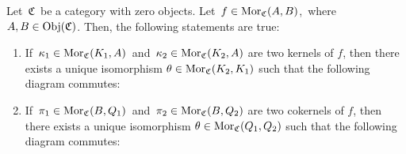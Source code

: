 \vskip 0.5cm
\begin{proposition}
\mbox{}
\vskip 0.15cm
\noindent
Let \,$\mathfrak{C}$\, be a category with zero objects.
Let \,$f \in \textnormal{Mor}_{\mathfrak{C}}(A,B)$,\, where \,$A, B \in \textnormal{Obj}(\mathfrak{C})$.
Then, the following statements are true:
\begin{enumerate}
\item
	If \,$\kappa_{1} \in \textnormal{Mor}_{\mathfrak{C}}(K_{1},A)$\, and \,$\kappa_{2} \in \textnormal{Mor}_{\mathfrak{C}}(K_{2},A)$
	are two kernels of $f$, then there exists a unique isomorphism $\theta \in \textnormal{Mor}_{\mathfrak{C}}(K_{2},K_{1})$
	such that the following diagram commutes:
	\begin{center}
	\end{center}
\item
	If \,$\pi_{1} \in \textnormal{Mor}_{\mathfrak{C}}(B,Q_{1})$\, and \,$\pi_{2} \in \textnormal{Mor}_{\mathfrak{C}}(B,Q_{2})$
	are two cokernels of $f$, then there exists a unique isomorphism $\theta \in \textnormal{Mor}_{\mathfrak{C}}(Q_{1},Q_{2})$
	such that the following diagram commutes:
	\begin{center}
	\end{center}
\end{enumerate}
\end{proposition}
\proof
